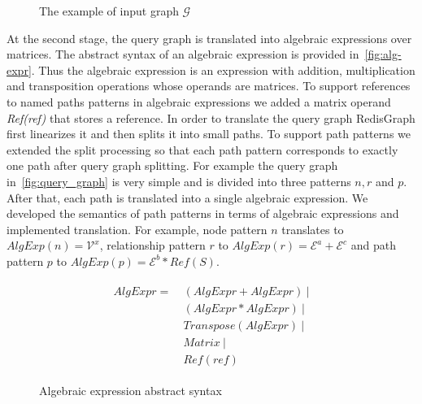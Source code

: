 \begin{figure}[h]
    \centering        
    \caption{The example of input graph $\mathcal{G}$}
    \label{fig:query_graph}
\end{figure}

At the second stage, the query graph is translated into algebraic expressions over matrices. The abstract syntax of an algebraic expression is provided in~\autoref{fig:alg-expr}. Thus the algebraic expression is an expression with addition, multiplication and transposition operations whose operands are matrices. To support references to named paths patterns in algebraic expressions we added a matrix operand \textit{Ref(ref)} that stores a reference. In order to translate the query graph RedisGraph first linearizes it and then splits it into small paths. To support path patterns we extended the split processing so that each path pattern corresponds to exactly one path after query graph splitting. For example the query graph in~\autoref{fig:query_graph} is very simple and is divided into three patterns $n, r$ and $p$. After that, each path is translated into a single algebraic expression. We developed the semantics of path patterns in terms of algebraic expressions and implemented translation. For example, node pattern $n$ translates to $AlgExp(n) = \mathcal{V}^x$, relationship pattern $r$ to $AlgExp(r) = \mathcal{E}^a + \mathcal{E}^c$ and path pattern $p$ to $AlgExp(p) = \mathcal{E}^b * Ref(S)$.


\begin{figure}[H]
\caption{Algebraic expression abstract syntax}
\label{fig:alg-expr}
\begin{align*}
\begin{split}
AlgExpr= ~ &(AlgExpr + AlgExpr)~| \\
           &(AlgExpr * AlgExpr)~| \\
           &Transpose(AlgExpr)~| \\
           &Matrix~| \\
           &Ref(ref)        
\end{split}
\end{align*}
\end{figure}

